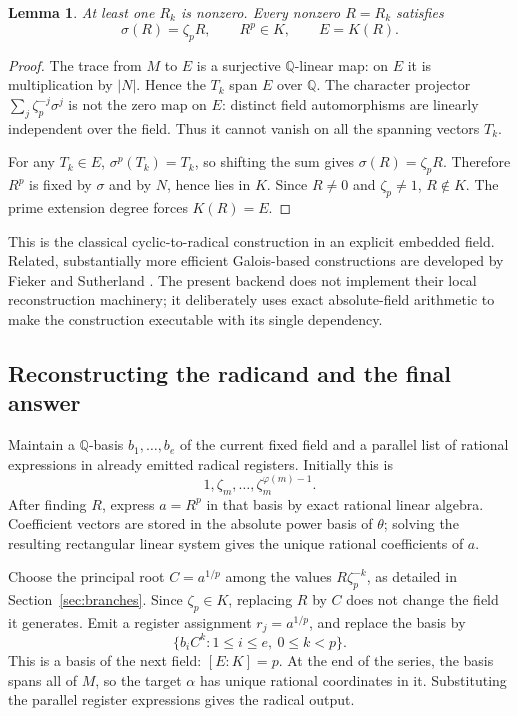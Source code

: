 \documentclass[11pt,letterpaper]{article}
\newtheorem{lemma}[theorem]{Lemma}
\theoremstyle{definition}\newtheorem{definition}[theorem]{Definition}
\theoremstyle{remark}\newtheorem{remark}[theorem]{Remark}
\newcommand{\Q}{\mathbb Q}\newcommand{\C}{\mathbb C}\newcommand{\Z}{\mathbb Z}
\begin{document}
\begin{lemma}
At least one \(R_k\) is nonzero. Every nonzero \(R=R_k\) satisfies
\[
 \sigma(R)=\zeta_pR,\qquad R^p\in K,\qquad E=K(R).
\]
\end{lemma}
\begin{proof}
The trace from \(M\) to \(E\) is a surjective \(\Q\)-linear map: on \(E\)
it is multiplication by \(|N|\). Hence the \(T_k\) span \(E\) over
\(\Q\). The character projector
\(\sum_j\zeta_p^{-j}\sigma^j\) is not the zero map on \(E\): distinct
field automorphisms are linearly independent over the field. Thus it cannot
vanish on all the spanning vectors \(T_k\).

For any \(T_k\in E\), \(\sigma^p(T_k)=T_k\), so shifting the sum gives
\(\sigma(R)=\zeta_pR\). Therefore \(R^p\) is fixed by \(\sigma\) and
by \(N\), hence lies in \(K\). Since \(R\ne0\) and \(\zeta_p\ne1\),
\(R\notin K\). The prime extension degree forces \(K(R)=E\).
\end{proof}
This is the classical cyclic-to-radical construction in an explicit embedded
field. Related, substantially more efficient Galois-based constructions are
developed by Fieker and Sutherland \cite{fiekersutherland}. The present backend
does not implement their local reconstruction machinery; it deliberately uses
exact absolute-field arithmetic to make the construction executable with its
single dependency.

\subsection{Reconstructing the radicand and the final answer}
Maintain a \(\Q\)-basis \(b_1,\ldots,b_e\) of the current fixed field and
a parallel list of rational expressions in already emitted radical registers.
Initially this is
\[
 1,\zeta_m,\ldots,\zeta_m^{\varphi(m)-1}.
\]
After finding \(R\), express \(a=R^p\) in that basis by exact rational
linear algebra. Coefficient vectors are stored in the absolute power basis
of \(\theta\); solving the resulting rectangular linear system gives the
unique rational coefficients of \(a\).

Choose the principal root \(C=a^{1/p}\) among the values
\(R\zeta_p^{-k}\), as detailed in Section~\ref{sec:branches}. Since
\(\zeta_p\in K\), replacing \(R\) by \(C\) does not change the field it
generates. Emit a register assignment \(r_j=a^{1/p}\), and replace the basis by
\[
 \{b_i C^k:1\le i\le e,\ 0\le k<p\}.
\]
This is a basis of the next field: \([E:K]=p\). At the end of the series,
the basis spans all of \(M\), so the target \(\alpha\) has unique rational
coordinates in it. Substituting the parallel register expressions gives the
radical output.
\end{document}
